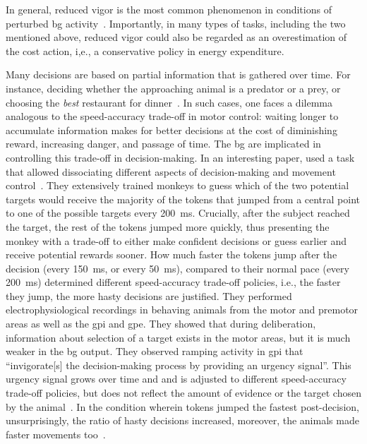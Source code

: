 In general, reduced vigor is the most common phenomenon in conditions of perturbed \gls{bg} activity~\cite{Bailey2006JNeurosci, Rueda2015NN, CastaneAnna2010, Bergstrom2018Cell, Lemke2019NN, Geddes2018Cell, Bailey2006JNeurosci, Hart2018CurrBiol}.
Importantly, in many types of tasks, including the two mentioned above, reduced vigor could also be regarded as an overestimation of the cost action, i,e., a conservative policy in energy expenditure.
\par
Many decisions are based on partial information that is gathered over time.
For instance, deciding whether the approaching animal is a predator or a prey, or choosing the \textit{best} restaurant for dinner~\cite{Bogacz2010TINS}.
In such cases, one faces a dilemma analogous to the speed-accuracy trade-off in motor control: waiting longer to accumulate information makes for better decisions at the cost of diminishing reward, increasing danger, and passage of time.
The \gls{bg} are implicated in controlling this trade-off in decision-making.
In an interesting paper, \citeauthor{Thura2017Neruon} used a task that allowed dissociating different aspects of decision-making and movement control~\cite{Thura2017Neruon}.
They extensively trained monkeys to guess which of the two potential targets would receive the majority of the tokens that jumped from a central point to one of the possible targets every 200~ms.
Crucially, after the subject reached the target, the rest of the tokens jumped more quickly, thus presenting the monkey with a trade-off to either make confident decisions or guess earlier and receive potential rewards sooner.
How much faster the tokens jump after the decision (every 150~ms, or every 50~ms), compared to their normal pace (every 200~ms) determined different speed-accuracy trade-off policies, i.e., the faster they jump, the more hasty decisions are justified.
They performed electrophysiological recordings in behaving animals from the motor and premotor areas as well as the \gls{gpi} and \gls{gpe}.
They showed that during deliberation, information about selection of a target exists in the motor areas, but it is much weaker in the \gls{bg} output.
They observed ramping activity in \gls{gpi} that ``invigorate[s] the decision-making process by providing an urgency signal''.
This urgency signal grows over time and and is adjusted to different speed-accuracy trade-off policies, but does not reflect the amount of evidence or the target chosen by the animal~\cite{Thura2017Neruon}.
In the condition wherein tokens jumped the fastest post-decision, unsurprisingly, the ratio of hasty decisions increased, moreover, the animals made faster movements too~\cite{Thura2014JNeurosci}.
